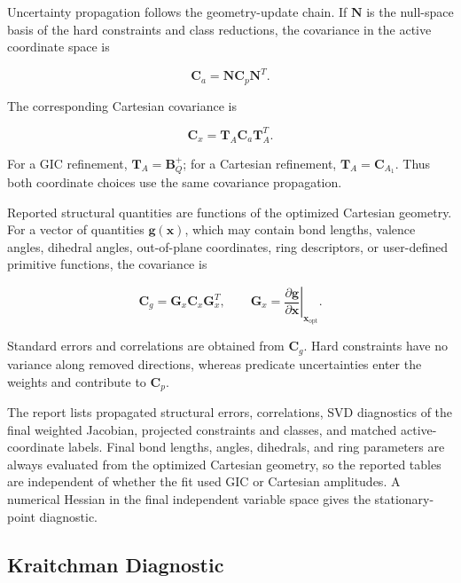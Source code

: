 \documentclass[aip,jcp,reprint,longbibliography,floatfix]{revtex4-2}
\begin{document}
Uncertainty propagation follows the geometry-update chain. If $\mathbf{N}$ is
the null-space basis of the hard
constraints and class reductions, the covariance in the active coordinate
space is

\begin{equation}
\mathbf{C}_{a}
=
\mathbf{N}
\mathbf{C}_{p}
\mathbf{N}^{T}.
\end{equation}

The corresponding Cartesian covariance is

\begin{equation}
\mathbf{C}_{x}
=
\mathbf{T}_{A}
\mathbf{C}_{a}
\mathbf{T}_{A}^{T}.
\end{equation}

For a GIC refinement, $\mathbf{T}_{A}=\mathbf{B}_{Q}^{+}$; for a Cartesian
refinement, $\mathbf{T}_{A}=\mathbf{C}_{A_1}$. Thus both coordinate choices use
the same covariance propagation.

Reported structural quantities are functions of the optimized Cartesian
geometry. For a vector of quantities
$\mathbf{g}(\mathbf{x})$, which may contain bond lengths, valence angles,
dihedral angles, out-of-plane coordinates, ring descriptors, or user-defined
primitive functions, the covariance is

\begin{equation}
\mathbf{C}_{g}
=
\mathbf{G}_{x}
\mathbf{C}_{x}
\mathbf{G}_{x}^{T},
\qquad
\mathbf{G}_{x}
=
\left.
\frac{\partial\mathbf{g}}
{\partial\mathbf{x}}
\right|_{\mathbf{x}_{\mathrm{opt}}}.
\end{equation}

Standard errors and correlations are obtained from $\mathbf{C}_{g}$. Hard
constraints have no variance along removed directions, whereas predicate
uncertainties enter the weights and contribute to $\mathbf{C}_{p}$. 

The report lists propagated structural errors, correlations, SVD diagnostics of
the final weighted Jacobian, projected constraints and classes, and matched
active-coordinate labels. Final bond lengths, angles, dihedrals, and ring
parameters are always evaluated from the optimized Cartesian geometry, so the
reported tables are independent of whether the fit used GIC or Cartesian
amplitudes. A numerical Hessian in the final independent variable space gives
the stationary-point diagnostic.


\subsection{Kraitchman Diagnostic}
\end{document}

